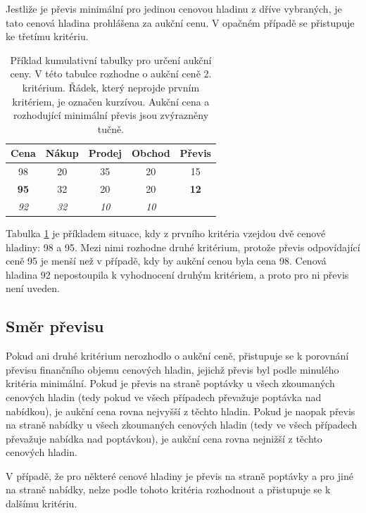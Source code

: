 \documentclass[thesis=M,czech]{FITthesis}[2012/06/26]
\begin{document}
Jestliže je převis minimální pro jedinou cenovou hladinu z dříve vybraných, je tato cenová hladina prohlášena za aukční cenu. 
V opačném případě se přistupuje ke třetímu kritériu.

\begin{table}\centering
	\begin{tabular}{|c|c|c|c|c|}\hline
		Cena		& Nákup	& Prodej	& Obchod	& Převis		\tabularnewline \hline \hline
		98	 	& 20 		& 35 		& 20 		& 15	 		\tabularnewline \hline
		\textbf{95}	& 32 		& 20 		& 20 		& \textbf{12} 	\tabularnewline \hline
		\textit{92} 	& \textit{32}	& \textit{10}	& \textit{10}	&			\tabularnewline \hline
	\end{tabular}
	\caption[Příklad tabulky pro určení aukční ceny]{Příklad kumulativní tabulky pro určení aukční ceny. V této tabulce rozhodne
		o aukční ceně 2. kritérium. Řádek, který neprojde prvním kritériem, je označen kurzívou. Aukční cena a rozhodující 
		minimální převis jsou zvýrazněny tučně.}
	\label{tab:pricecalcex2}
\end{table}

Tabulka \ref{tab:pricecalcex2} je příkladem situace, kdy z prvního kritéria vzejdou dvě cenové hladiny: 98 a 95. Mezi nimi rozhodne
druhé kritérium, protože převis odpovídající ceně 95 je menší než v případě, kdy by aukční cenou byla cena 98. Cenová hladina 92
nepostoupila k vyhodnocení druhým kritériem, a proto pro ni převis není uveden.


\subsection{Směr převisu}

Pokud ani druhé kritérium nerozhodlo o aukční ceně, přistupuje se k porovnání  převisu finančního objemu cenových hladin,
jejichž převis byl podle minulého kritéria minimální. Pokud je převis na straně poptávky u všech zkoumaných cenových hladin (tedy
pokud ve všech případech převažuje poptávka nad nabídkou), je aukční cena rovna nejvyšší z těchto hladin. Pokud je naopak převis
na straně nabídky u všech zkoumaných cenových hladin (tedy ve všech případech převažuje nabídka nad poptávkou), je aukční cena
rovna nejnižší z těchto cenových hladin.

V případě, že pro některé cenové hladiny je převis na straně poptávky a pro jiné na straně nabídky, nelze podle tohoto kritéria 
rozhodnout a přistupuje se k dalšímu kritériu.
\end{document}
